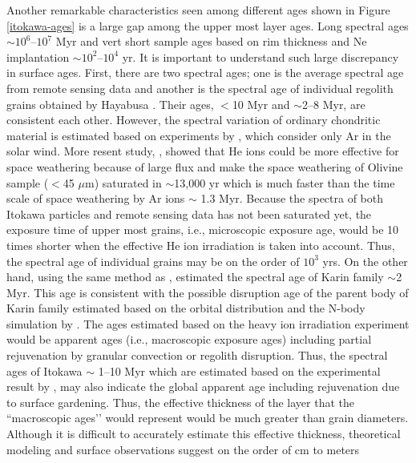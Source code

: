 \documentclass[3p,authoryear]{elsarticle}
\begin{document}
Another remarkable characteristics seen among different ages shown in Figure \ref{itokawa-ages} is a large gap among the upper most layer ages. Long spectral ages $\sim 10^6$--$10^7$ Myr and vert short sample ages based on rim thickness and Ne implantation $\sim 10^2$--$10^4$ yr. It is important to understand such large discrepancy in surface ages. First, there are two spectral ages; one is the average spectral age from remote sensing data \citep{koga2014} and another is the spectral age of individual regolith grains obtained by Hayabusa \citep{bonal2015}. Their ages, $<$10 Myr and $\sim$2--8 Myr, are consistent each other.
 However, the spectral variation of ordinary chondritic material is estimated based on experiments by \citet{strazzulla2005}, which consider only Ar in the solar wind. More resent study, \citet{loeffler2009}, showed that He ions could be more effective for space weathering because of large flux and make the space weathering of Olivine sample ($<$45 $\mu$m) saturated in $\sim$13,000 yr which is much faster than the time scale of space weathering by Ar ions $\sim$ 1.3 Myr. Because the spectra of both Itokawa particles and remote sensing data has not been saturated yet, the exposure time of upper most grains, i.e., microscopic exposure age, would be 10 times shorter when the effective He ion irradiation is taken into account. Thus, the spectral age of individual grains may be on the order of $10^3$ yrs. On the other hand, using the same method as \citet{bonal2015}, \citet{brunetto2006b} estimated the spectral age of Karin family $\sim$2 Myr. This age is consistent with the possible disruption age of the parent body of Karin family estimated based on the orbital distribution and the N-body simulation by \citet{nesvorny2002}. The ages estimated based on the heavy ion irradiation experiment \citep{strazzulla2005} would be apparent ages (i.e., macroscopic exposure ages) including partial rejuvenation by granular convection or regolith disruption. Thus, the spectral ages of Itokawa $\sim$ 1--10 Myr \citep{koga2014,bonal2015} which are estimated based on the experimental result by \citet{strazzulla2005}, may also indicate the global apparent age including rejuvenation due to surface gardening. Thus, the effective thickness of the layer that the ``macroscopic ages’’ would represent would be much greater than grain diameters. Although it is difficult to accurately estimate this effective thickness, theoretical modeling and surface observations suggest on the order of cm to meters
\end{document}
